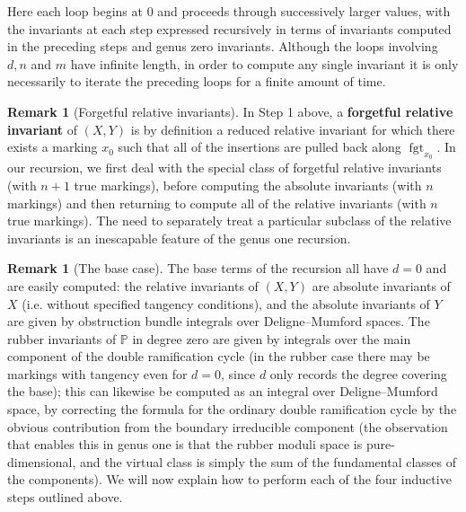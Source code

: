\documentclass[11pt]{amsart}
\newcommand{\fgt}{\operatorname{fgt}}
\theoremstyle{definition}
\theoremstyle{definition}
\newtheorem{remark}[thm]{Remark}
\begin{document}
\begin{algorithm}[H]
\DontPrintSemicolon
{}
\end{algorithm}\bigskip

\noindent Here each loop begins at $0$ and proceeds through successively larger values, with the invariants at each step expressed recursively in terms of invariants computed in the preceding steps and genus zero invariants. Although the loops involving $d, n$ and $m$ have infinite length, in order to compute any single invariant it is only necessarily to iterate the preceding loops for a finite amount of time.

\begin{remark}[Forgetful relative invariants] In Step 1 above, a \textbf{forgetful relative invariant} of $(X,Y)$ is by definition a reduced relative invariant for which there exists a marking $x_0$ such that all of the insertions are pulled back along $\fgt_{x_0}$. In our recursion, we first deal with the special class of forgetful relative invariants (with $n+1$ true markings), before computing the absolute invariants (with $n$ markings) and then returning to compute all of the relative invariants (with $n$ true markings). The need to separately treat a particular subclass of the relative invariants is an inescapable feature of the genus one recursion.\end{remark}

\begin{remark}[The base case]
The base terms of the recursion all have $d=0$ and are easily computed: the relative invariants of $(X,Y)$ are absolute invariants of $X$ (i.e. without specified tangency conditions), and the absolute invariants of $Y$ are given by obstruction bundle integrals over Deligne--Mumford spaces. The rubber invariants of $\mathbb{P}$ in degree zero are given by integrals over the main component of the double ramification cycle (in the rubber case there may be markings with tangency even for $d=0$, since $d$ only records the degree covering the base); this can likewise be computed as an integral over Deligne--Mumford space, by correcting the formula for the ordinary double ramification cycle \cite{Hain,JPPZ} by the obvious contribution from the boundary irreducible component (the observation that enables this in genus one is that the rubber moduli space is pure-dimensional, and the virtual class is simply the sum of the fundamental classes of the components). We will now explain how to perform each of the four inductive steps outlined above.\end{remark}
\end{document}
